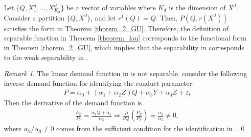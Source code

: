 \documentclass[11pt, a4paper]{article}
\theoremstyle{remark}
\newtheorem{remark}{Remark}
\begin{document}
Let $\{Q,X_{1}^{d}, \ldots,  X_{K_d}^{d}\}$ be a vector of variables where $K_d$ is the dimension of $X^{d}$.
Consider a partition $\{Q, X^{d}\}$, and let $r^1(Q) = Q$.
Then, $P(Q, r(X^{d}))$ satisfies the form in Theorem \ref{thorem_2_GU}.
Therefore, the definition of separable function in Theorem \ref{theorem_lau} corresponds to the functional form in  Theorem \ref{thorem_2_GU}, which implies that the separability in \citet{lau1982identifying} corresponds to the weak separability in \citet{goldmanNote1964}.

\begin{remark}
    The linear demand function in \citet{bresnahan1982oligopoly} is not separable.
    \citet{bresnahan1982oligopoly} consider the following inverse demand function for identifying the conduct parameter:
    \begin{align}
        P = \alpha_0 + (\alpha_1 + \alpha_2 Z) Q + \alpha_3 Y + \alpha_4 Z + \varepsilon_t
    \end{align}
    Then the derivative of the demand function is
    \begin{align}
        \frac{P_Z}{P_Y} = \frac{\alpha_2 Q + \alpha_4}{\alpha_3} \Longrightarrow \frac{\partial}{\partial Q}\left(\frac{P_Z}{P_Y}\right) = \frac{\alpha_2}{\alpha_3} \ne 0,
    \end{align}
    where $\alpha_2/\alpha_3 \ne 0$ comes from the sufficient condition for the identification in \citet{matsumura2023resolving}.
    \qed
\end{remark}
\end{document}
